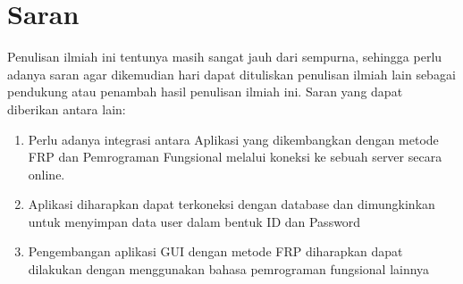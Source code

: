 \documentclass[pi.tex]{subfile}
\begin{document}
\section{Saran}
Penulisan ilmiah ini tentunya masih sangat jauh dari sempurna, sehingga perlu adanya saran agar dikemudian hari dapat dituliskan penulisan ilmiah lain sebagai pendukung atau penambah hasil penulisan ilmiah ini. Saran yang dapat diberikan antara lain:
\begin{enumerate}[leftmargin=1.25cm]
  \item Perlu adanya integrasi antara Aplikasi yang dikembangkan dengan metode FRP dan Pemrograman Fungsional melalui koneksi ke sebuah server secara online.
  \item Aplikasi diharapkan dapat terkoneksi dengan database dan dimungkinkan untuk menyimpan data user dalam bentuk ID dan Password
  \item Pengembangan aplikasi GUI dengan metode FRP diharapkan dapat dilakukan dengan menggunakan bahasa pemrograman fungsional lainnya
\end{enumerate}
\end{document}
